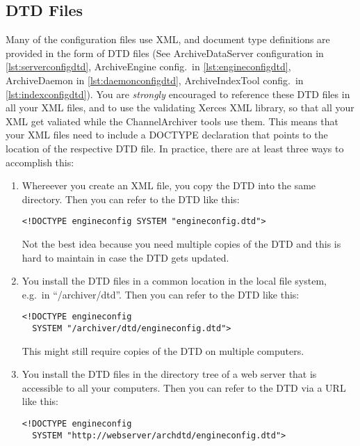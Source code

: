 \subsection{DTD Files} \label{sec:dtdfiles}
Many of the configuration files use XML, and document type
definitions are provided in the form of DTD files
(See ArchiveDataServer configuration in \ref{lst:serverconfigdtd},
 ArchiveEngine config.\ in \ref{lst:engineconfigdtd}, ArchiveDaemon in
 \ref{lst:daemonconfigdtd}, ArchiveIndexTool config.\ in
 \ref{lst:indexconfigdtd}).
You are \emph{strongly} encouraged to reference these DTD files in all
your XML files, and to use the validating Xerces XML library, so that
all your XML get valiated while the ChannelArchiver tools use them.
This means that your XML files need to include a DOCTYPE declaration
that points to the location of the respective DTD file.
In practice, there are at least three ways to accomplish this:
\begin{enumerate}
\item Whereever you create an XML file, you copy the DTD into the same
  directory. Then you can refer to the DTD like this: 
  \begin{lstlisting}[keywordstyle=\sffamily]
  <!DOCTYPE engineconfig SYSTEM "engineconfig.dtd">
  \end{lstlisting}
  \noindent Not the best idea because you need multiple copies of the
  DTD and this is hard to maintain in case the DTD gets updated.
\item You install the DTD files in a common location in the local file
  system, e.g.\ in ``/archiver/dtd''. Then you can refer to the DTD like this: 
  \begin{lstlisting}[keywordstyle=\sffamily]
  <!DOCTYPE engineconfig
  SYSTEM "/archiver/dtd/engineconfig.dtd">
  \end{lstlisting}
  \noindent This might still require copies of the DTD on multiple computers.
\item You install the DTD files in the directory tree of a web server
  that is accessible to all your computers.
  Then you can refer to the DTD via a URL like this: 
  \begin{lstlisting}[keywordstyle=\sffamily]
  <!DOCTYPE engineconfig
  SYSTEM "http://webserver/archdtd/engineconfig.dtd">
  \end{lstlisting}
\end{enumerate}
